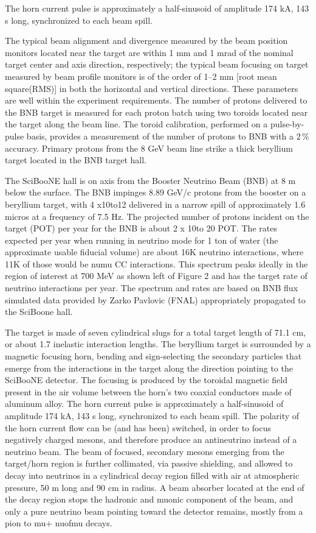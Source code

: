 The horn current pulse is approximately a half-sinusoid of amplitude 174 kA, 143 s long, %
synchronized to each beam spill. 

The typical beam alignment and divergence measured by the beam position monitors located %
near the target are within 1 mm and 1 mrad of the nominal target center and axis direction, %
respectively; the typical beam focusing on target measured by beam profile monitors is %
of the order of 1–2 mm [root mean square(RMS)] in both the horizontal and vertical directions.
These parameters are well within the experiment requirements. 
The number of protons delivered to the BNB target is measured for each proton %
batch using two toroids located near the target along the beam line. 
The toroid calibration, performed on a pulse-by-pulse basis, provides a measurement %
of the number of protons to BNB with a 2\,\% accuracy.
Primary protons from the 8 GeV beam line strike a thick beryllium target located %
in the BNB target hall.

The SciBooNE hall is on axis from the Booster Neutrino Beam (BNB) at 8 m below the surface.
The BNB impinges 8.89 GeV/c protons from the booster on a beryllium target, with %
4 x10to12 delivered in a narrow spill of approximately 1.6 micros at a frequency of 7.5 Hz. 
The projected number of protons incident on the target (POT) per year for the BNB is %
about 2 x 10to 20 POT.
The rates expected per year when running in neutrino mode for 1 ton of water %
(the approximate usable fiducial volume) are about 16K neutrino interactions, %
where 11K of those would be numu CC interactions. 
This spectrum peaks ideally in the region of interest at 700 MeV as shown left of Figure 2 %
and has the target rate of neutrino interactions per year.
The spectrum and rates are based on BNB flux simulated data provided by Zarko Pavlovic (FNAL)%
appropriately propagated to the SciBoone hall.

The target is made of seven cylindrical slugs for a total target length of 71.1 cm, %
or about 1.7 inelastic interaction lengths.
The beryllium target is surrounded by a magnetic focusing horn, bending and %
sign-selecting the secondary particles that emerge from the interactions in the target along
the direction pointing to the SciBooNE detector.
The focusing is produced by the toroidal magnetic field present in the air volume %
between the horn’s two coaxial conductors made of aluminum alloy. 
The horn current pulse is approximately a half-sinusoid of amplitude 174 kA, 143 s long, %
synchronized to each beam spill. 
The polarity of the horn current flow can be (and has been) switched, in order to %
focus negatively charged mesons, and therefore produce an antineutrino instead of a neutrino beam.
The beam of focused, secondary mesons emerging from the target/horn region is further collimated, %
via passive shielding, and allowed to decay into neutrinos in a cylindrical decay %
region filled with air at atmospheric pressure, 50 m long and 90 cm in radius. 
A beam absorber located at the end of the decay region stops the hadronic and muonic %
component of the beam, and only a pure neutrino beam pointing toward the detector remains, %
mostly from a pion to mu+ nuofmu decays.




